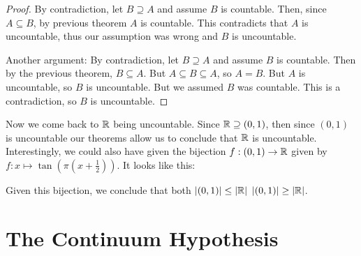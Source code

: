 \documentclass[main.tex]{subfiles}
\begin{document}
\begin{proof}
	By contradiction, let \(B \supseteq A\) and assume \(B\) is countable.
	Then, since \(A \subseteq B\), by previous theorem \(A\) is countable.
	This contradicts that \(A\) is uncountable, thus our assumption was wrong and \(B\) is uncountable.
	
	\bigskip
	Another argument:
	By contradiction, let \(B \supseteq A\) and assume \(B\) is countable. Then by the previous theorem, \(B \subseteq A\). But \(A \subseteq B \subseteq A\), so \(A = B\). But \(A\) is uncountable, so \(B\) is uncountable. But we assumed \(B\) was countable. This is a contradiction, so \(B\) is uncountable.
\end{proof}

Now we come back to \(\mathbb{R}\) being uncountable. Since \(\mathbb{R} \supseteq (0,1)\), then since \((0,1)\) is uncountable our theorems allow us to conclude that \(\mathbb{R}\) is uncountable. Interestingly, we could also have given the bijection \(f : (0,1) \rightarrow \mathbb{R}\) given by \(f : x \mapsto \tan(\pi(x+\frac{1}{2}))\). It looks like this:
\begin{center}
\end{center}
Given this bijection, we conclude that both \(|(0,1)| \leq |\mathbb{R}|\) \(|(0,1)| \geq |\mathbb{R}|\).

\section{The Continuum Hypothesis}
\end{document}
